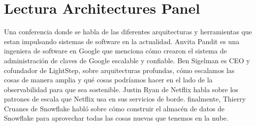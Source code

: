 \documentclass{article}
\begin{document}
\section{Lectura Architectures Panel}

Una conferencia donde se habla de las diferentes arquitecturas y herramientas que estan impulsando sistemas de software en la actualidad.  Anvita Pandit es una ingeniera de software en Google que menciona cómo crearon el sistema de administración de claves de Google escalable y confiable. Ben Sigelman es CEO y cofundador de LightStep, sobre arquitecturas profundas, cómo escalamos las cosas de manera amplia y qué cosas podríamos hacer en el lado de la observabilidad para que sea sostenible. Justin Ryan de Netflix habla sobre los patrones de escala que Netflix usa en sus servicios de borde. finalmente, Thierry Cruanes de Snowflake habló sobre cómo construir el almacén de datos de Snowflake para aprovechar todas las cosas nuevas que tenemos en la nube. 
\end{document}
